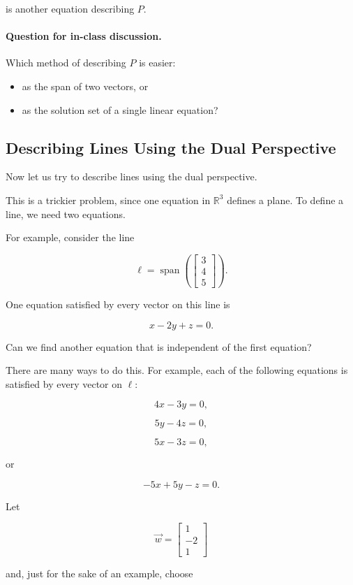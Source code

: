 is another equation describing $P$.

\paragraph{Question for in-class discussion.}
Which method of describing $P$ is easier:

\begin{itemize}
  \item as the span of two vectors, or
  \item as the solution set of a single linear equation?
\end{itemize}

\subsection{Describing Lines Using the Dual Perspective}

Now let us try to describe lines using the dual perspective.

This is a trickier problem, since one equation in $\mathbb{R}^3$ defines a
plane. To define a line, we need two equations.

For example, consider the line

\[
\ell
=
\operatorname{span}
\left(
\begin{bmatrix}
3\\
4\\
5
\end{bmatrix}
\right).
\]

One equation satisfied by every vector on this line is

\[
x-2y+z=0.
\]

Can we find another equation that is independent of the first equation?

There are many ways to do this. For example, each of the following equations
is satisfied by every vector on $\ell$:

\[
4x-3y=0,
\]

\[
5y-4z=0,
\]

\[
5x-3z=0,
\]

or

\[
-5x+5y-z=0.
\]

Let

\[
\vec w=
\begin{bmatrix}
1\\
-2\\
1
\end{bmatrix}
\]

and, just for the sake of an example, choose


